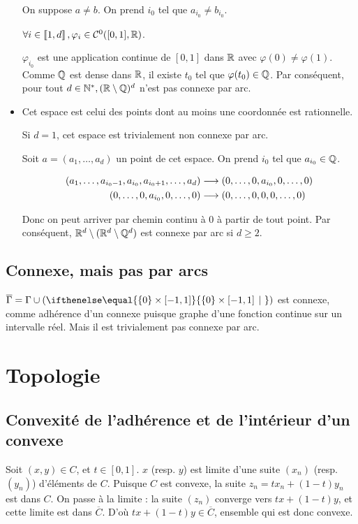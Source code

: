 \begin{itemize}
        On suppose $a\neq b$. On prend $i_0$ tel que $a_{i_0} \neq b_{i_0}$.
        
        $\forall i \in \left\llbracket 1, d \right\rrbracket, \varphi_i \in \mathcal{C}^0([0,1], \mathbb{R})$.
        
        $\varphi_{i_0}$ est une application continue de $[0,1]$ dans $\mathbb{R}$ avec $\varphi(0) \neq \varphi(1)$. Comme $\mathbb{Q}$ est dense dans $\mathbb{R}$, il existe $t_0$ tel que $\varphi(t_0) \in \mathbb{Q}$. Par conséquent, pour tout $d \in \mathbb{N}^*, (\mathbb{R}\setminus\mathbb{Q})^d$ n'est pas connexe par arc.
        
    \item Cet espace est celui des points dont au moins une coordonnée est rationnelle.
    
        Si $d=1$, cet espace est trivialement non connexe par arc.
    
        Soit $a = (a_1,\ldots,a_d)$ un point de cet espace. On prend $i_0$ tel que $a_{i_0} \in \mathbb{Q}$.
        
        \[
            \begin{aligned}
                (a_1,\ldots,a_{i_0-1},a_{i_0},a_{i_0+1},\ldots,a_d) &\longrightarrow (0,\ldots,0,a_{i_0},0,\ldots,0)\\
                (0,\ldots,0,a_{i_0},0,\ldots,0) &\longrightarrow (0,\ldots,0,0,0,\ldots,0)
            \end{aligned}
        \]
        
        Donc on peut arriver par chemin continu à $0$ à partir de tout point. Par conséquent, $\mathbb{R}^d\setminus(\mathbb{R}^d\setminus \mathbb{Q}^d)$ est connexe par arc si $d\geqslant 2$.
\end{itemize}

\subsection{Connexe, mais pas par arcs}

    $\overline{\Gamma} = \Gamma \cup (\set{\lbrace 0 \rbrace \times [-1,1]}{})$ est connexe, comme adhérence d'un connexe puisque graphe d'une fonction continue sur un intervalle réel. Mais il est trivialement pas connexe par arc.

\section{Topologie}

\subsection{Convexité de l'adhérence et de l'intérieur d'un convexe}
Soit $(x,y)\in C$, et $t\in [0,1]$. $x$ (resp. $y$) est limite d'une suite $(x_n)$ (resp. $(y_n)$) d'éléments de $C$. Puisque $C$ est convexe, la suite $z_n=tx_n+ (1-t)y_n$ est dans $C$. On passe à la limite : la suite $(z_n)$ converge vers $tx + (1-t)y$, et cette limite est dans $\overline{C}$. D'où $tx+ (1-t)y \in \overline{C}$, ensemble qui est donc convexe.

